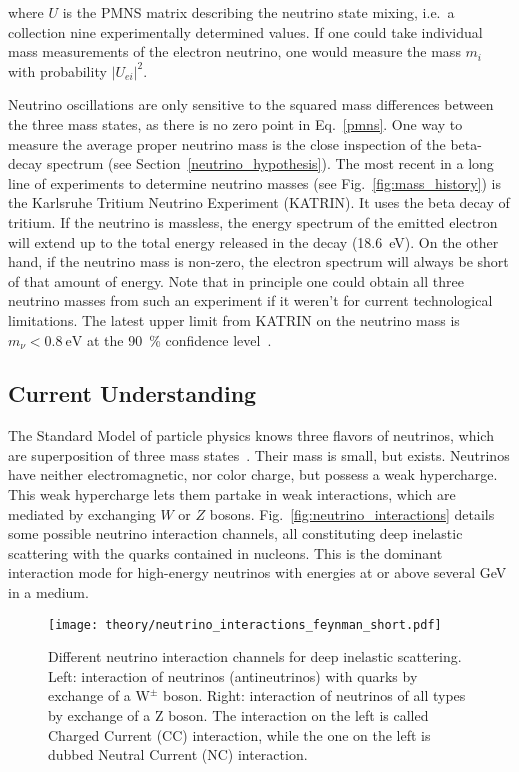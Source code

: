 where $U$ is the PMNS matrix describing the neutrino state mixing, i.e.\ a collection nine experimentally determined values. If one could take individual mass measurements of the electron neutrino, one would measure the mass $m_i$ with probability $|U_{ei}|^2$.

Neutrino oscillations are only sensitive to the squared mass differences between the three mass states, as there is no zero point in Eq.~\ref{pmns}. One way to measure the average proper neutrino mass is the close inspection of the beta-decay spectrum (see Section~\ref{neutrino_hypothesis}). The most recent in a long line of experiments to determine neutrino masses (see Fig.~\ref{fig:mass_history}) is the Karlsruhe Tritium Neutrino Experiment (KATRIN). It uses the beta decay of tritium. If the neutrino is massless, the energy spectrum of the emitted electron will extend up to the total energy released in the decay (\SI{18.6}{\eV}). On the other hand, if the neutrino mass is non-zero, the electron spectrum will always be short of that amount of energy. Note that in principle one could obtain all three neutrino masses from such an experiment if it weren't for current technological limitations. The latest upper limit from KATRIN on the neutrino mass is $m_\nu < \SI{0.8}{\eV}$ at the \SI{90}{\percent} confidence level~.


\subsection{Current Understanding}\label{neutrinos_current}
The Standard Model of particle physics knows three flavors of neutrinos, which are superposition of three mass states~. Their mass is small, but exists. Neutrinos have neither electromagnetic, nor color charge, but possess a weak hypercharge. This weak hypercharge lets them partake in weak interactions, which are mediated by exchanging $W$ or $Z$ bosons. Fig.~\ref{fig:neutrino_interactions} details some possible neutrino interaction channels, all constituting deep inelastic scattering with the quarks contained in nucleons. This is the dominant interaction mode for high-energy neutrinos with energies at or above several \unit{\giga\eV} in a medium.

\begin{figure}[htb]
  \texttt{[image: theory/neutrino\_interactions\_feynman\_short.pdf]}
  \caption[Neutrino interactions]{Different neutrino interaction channels for deep inelastic scattering. Left: interaction of neutrinos (antineutrinos) with quarks by exchange of a $\text{W}^{\pm}$ boson. Right: interaction of neutrinos of all types by exchange of a Z boson. The interaction on the left is called Charged Current (CC) interaction, while the one on the left is dubbed Neutral Current (NC) interaction.}
\end{figure}

